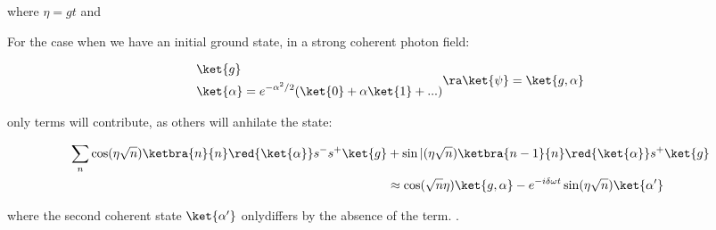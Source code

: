   \noindent where $ \eta = gt $ and 

  \noindent For  the case  when we  have an  initial ground
  state, in a strong coherent photon field:
	
  \begin{equation}\label{key}
    \begin{aligned}
      &\ket{g}\\
      &\ket{\alpha}     =     e^{-\alpha^2/2}(\ket{0}     +
      \alpha\ket{1} + ...)
    \end{aligned}\ra \ket{\psi} = \ket{g,\alpha}
  \end{equation}
	
  \noindent       only          terms  will  contribute,  as
  others will anhilate the  state:
	
  \begin{equation}\label{key}
    \begin{aligned}
      \sum_n\cos(\eta\sqrt{n})\ketbra{n}{n}\red{\ket{\alpha}}s^{-}s^{+}\ket{g} &+ \sin|(\eta\sqrt{n})\ketbra{n-1}{n}\red{\ket{\alpha}}s^{+}\ket{g}\\
      &    \approx    \cos(\sqrt{n}\eta)\ket{g,\alpha}    -
      e^{-i\delta\omega t}\sin(\eta\sqrt{n})\ket{\alpha'}
    \end{aligned}
  \end{equation}
	
  \noindent    where    the     second    coherent    state
  $  \ket{\alpha'}  $ onlydiffers  by  the  absence of  the
   term. .
	
